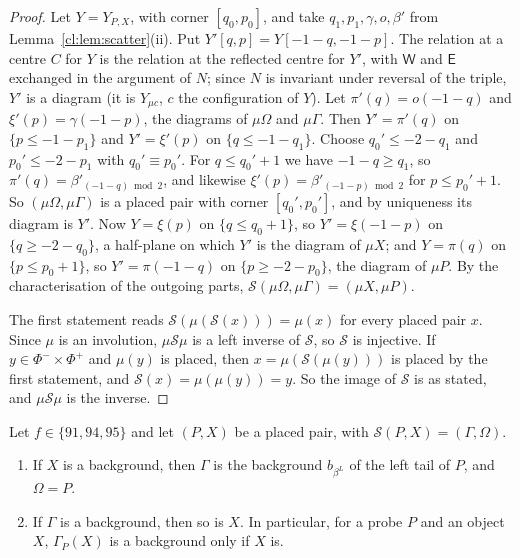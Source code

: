 \begin{proof}
Let $Y=Y_{P,X}$, with corner $[q_0,p_0]$, and take $q_1,p_1,\gamma,o,\beta'$ from Lemma~\ref{cl:lem:scatter}(ii). Put $Y'[q,p]=Y[-1-q,-1-p]$. The relation at a centre $C$ for $Y$ is the relation at the reflected centre for $Y'$, with $\mathsf W$ and $\mathsf E$ exchanged in the argument of $N$; since $N$ is invariant under reversal of the triple, $Y'$ is a diagram (it is $Y_{\mu c}$, $c$ the configuration of $Y$). Let $\pi'(q)=o(-1-q)$ and $\xi'(p)=\gamma(-1-p)$, the diagrams of $\mu \Omega$ and $\mu\Gamma$. Then $Y'=\pi'(q)$ on $\{p\le-1-p_1\}$ and $Y'=\xi'(p)$ on $\{q\le-1-q_1\}$. Choose $q_0'\le-2-q_1$ and $p_0'\le-2-p_1$ with $q_0'\equiv p_0'$. For $q\le q_0'+1$ we have $-1-q\ge q_1$, so $\pi'(q)=\beta'_{(-1-q)\bmod2}$, and likewise $\xi'(p)=\beta'_{(-1-p)\bmod2}$ for $p\le p_0'+1$. So $(\mu \Omega,\mu\Gamma)$ is a placed pair with corner $[q_0',p_0']$, and by uniqueness its diagram is $Y'$. Now $Y=\xi(p)$ on $\{q\le q_0+1\}$, so $Y'=\xi(-1-p)$ on $\{q\ge-2-q_0\}$, a half-plane on which $Y'$ is the diagram of $\mu X$; and $Y=\pi(q)$ on $\{p\le p_0+1\}$, so $Y'=\pi(-1-q)$ on $\{p\ge-2-p_0\}$, the diagram of $\mu P$. By the characterisation of the outgoing parts, $\mathcal S(\mu \Omega,\mu\Gamma)=(\mu X,\mu P)$.

The first statement reads $\mathcal S(\mu(\mathcal S(x)))=\mu(x)$ for every placed pair $x$. Since $\mu$ is an involution, $\mu \mathcal S\mu$ is a left inverse of $\mathcal S$, so $\mathcal S$ is injective. If $y\in\Phi^-\times\Phi^+$ and $\mu(y)$ is placed, then $x=\mu(\mathcal S(\mu(y)))$ is placed by the first statement, and $\mathcal S(x)=\mu(\mu(y))=y$. So the image of $\mathcal S$ is as stated, and $\mu \mathcal S\mu$ is the inverse.
\end{proof}

\begin{corollary}\label{cl:cor:dual}
Let $f\in\{91,94,95\}$ and let $(P,X)$ be a placed pair, with $\mathcal S(P,X)=(\Gamma,\Omega)$.
\begin{enumerate}
\item[(1)] If $X$ is a background, then $\Gamma$ is the background $b_{\beta^L}$ of the left tail of $P$, and $\Omega=P$.
\item[(2)] If $\Gamma$ is a background, then so is $X$. In particular, for a probe $P$ and an object $X$, $\Gamma_P(X)$ is a background only if $X$ is.
\end{enumerate}
\end{corollary}

